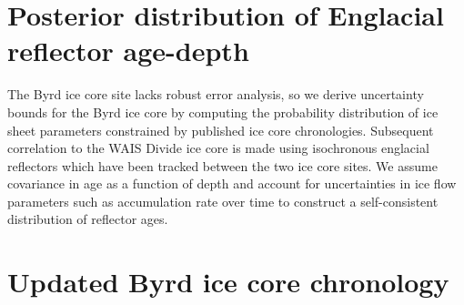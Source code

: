 \documentclass[letterpaper]{igs}
\begin{document}
\section{Posterior distribution of Englacial reflector age-depth}\label{byrdchronology}
The Byrd ice core site lacks robust error analysis, so we derive uncertainty bounds for the Byrd ice core by computing the probability distribution of ice sheet parameters constrained by published ice core chronologies. Subsequent correlation to the WAIS Divide ice core is made using isochronous englacial reflectors which have been tracked between the two ice core sites. We assume covariance in age as a function of depth and account for uncertainties in ice flow parameters such as accumulation rate over time to construct a self-consistent distribution of reflector ages.
	
	
\section{Updated Byrd ice core chronology}

%
%



\end{document}
